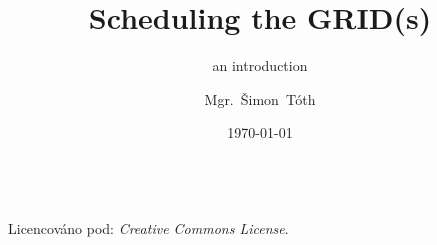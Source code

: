 

\title{Scheduling the GRID(s)}
\subtitle{an introduction}
\author[]{Mgr.~Šimon~Tóth}
\date{\today}

\newcommand{\CcNote}[1]{%
        Licencováno pod: \textit{Creative Commons #1 3.0 License}.%
}




\begin{frame}
\titlepage
	\vfill
	\begin{center}
		\\ {\tiny\CcNote{\CcLongnameByNcSa}}
		\vspace*{2ex}
	\end{center}
\end{frame}



{
\frame{}
}

